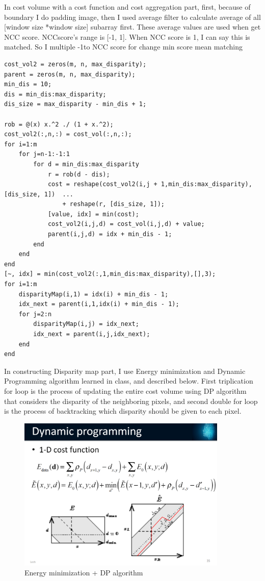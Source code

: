 In cost volume with a cost function and cost aggregation part, first, because of boundary I do padding image, then I used average filter to calculate average of all [window size *window size] subarray first. These average values are used when get NCC score. NCCscore’s range is [-1, 1]. When NCC score is 1, I can say this is matched. So I multiple -1to NCC score for change min score mean matching

\begin{lstlisting}[style=Matlab-editor]
cost_vol2 = zeros(m, n, max_disparity);
parent = zeros(m, n, max_disparity);
min_dis = 10;
dis = min_dis:max_disparity;
dis_size = max_disparity - min_dis + 1;

rob = @(x) x.^2 ./ (1 + x.^2);
cost_vol2(:,n,:) = cost_vol(:,n,:);
for i=1:m
    for j=n-1:-1:1
        for d = min_dis:max_disparity
            r = rob(d - dis);
            cost = reshape(cost_vol2(i,j + 1,min_dis:max_disparity), [dis_size, 1])  ...
                + reshape(r, [dis_size, 1]);
            [value, idx] = min(cost);
            cost_vol2(i,j,d) = cost_vol(i,j,d) + value;
            parent(i,j,d) = idx + min_dis - 1;
        end
    end
end
[~, idx] = min(cost_vol2(:,1,min_dis:max_disparity),[],3);
for i=1:m
    disparityMap(i,1) = idx(i) + min_dis - 1;
    idx_next = parent(i,1,idx(i) + min_dis - 1);
    for j=2:n
        disparityMap(i,j) = idx_next;
        idx_next = parent(i,j,idx_next);
    end
end
\end{lstlisting}

In constructing Disparity map part, I use Energy minimization and Dynamic Programming algorithm learned in class, and described below. First triplication for loop is the process of updating the entire cost volume using DP algorithm that considers the disparity of the neighboring pixels, and second double for loop is the process of backtracking which disparity should be given to each pixel.

\begin{figure}[h]
    \centering
    \includegraphics[width=10cm]{algorithm.png}
    \caption{ Energy minimization + DP algorithm}
    \label{fig:result1}
\end{figure}

